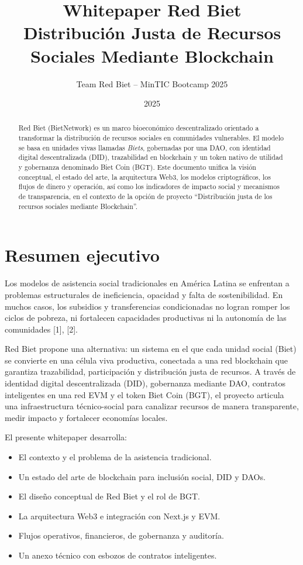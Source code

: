 \documentclass[12pt]{report}
\title{\textbf{Whitepaper Red Biet}\\
Distribución Justa de Recursos Sociales Mediante Blockchain}
\author{Team Red Biet -- MinTIC Bootcamp 2025}
\date{2025}
\begin{document}
\maketitle

\begin{abstract}
Red Biet (BietNetwork) es un marco bioeconómico descentralizado orientado a transformar la distribución de recursos sociales en comunidades vulnerables. 
El modelo se basa en unidades vivas llamadas \textit{Biets}, gobernadas por una DAO, con identidad digital descentralizada (DID), trazabilidad en blockchain y un token nativo de utilidad y gobernanza denominado Biet Coin (BGT). 
Este documento unifica la visión conceptual, el estado del arte, la arquitectura Web3, los modelos criptográficos, los flujos de dinero y operación, así como los indicadores de impacto social y mecanismos de transparencia, en el contexto de la opción de proyecto ``Distribución justa de los recursos sociales mediante Blockchain''.
\end{abstract}

\tableofcontents
\clearpage

\chapter{Resumen ejecutivo}

Los modelos de asistencia social tradicionales en América Latina se enfrentan a problemas estructurales de ineficiencia, opacidad y falta de sostenibilidad. 
En muchos casos, los subsidios y transferencias condicionadas no logran romper los ciclos de pobreza, ni fortalecen capacidades productivas ni la autonomía de las comunidades [1], [2].

Red Biet propone una alternativa: un sistema en el que cada unidad social (Biet) se convierte en una célula viva productiva, conectada a una red blockchain que garantiza trazabilidad, participación y distribución justa de recursos. 
A través de identidad digital descentralizada (DID), gobernanza mediante DAO, contratos inteligentes en una red EVM y el token Biet Coin (BGT), el proyecto articula una infraestructura técnico-social para canalizar recursos de manera transparente, medir impacto y fortalecer economías locales.

El presente whitepaper desarrolla:
\begin{itemize}
    \item El contexto y el problema de la asistencia tradicional.
    \item Un estado del arte de blockchain para inclusión social, DID y DAOs.
    \item El diseño conceptual de Red Biet y el rol de BGT.
    \item La arquitectura Web3 e integración con Next.js y EVM.
    \item Flujos operativos, financieros, de gobernanza y auditoría.
    \item Un anexo técnico con esbozos de contratos inteligentes.
\end{itemize}
\end{document}
